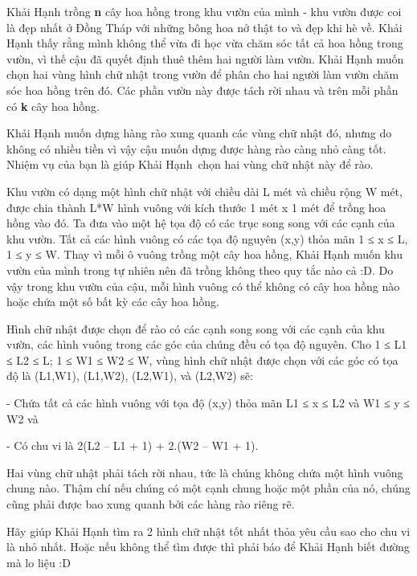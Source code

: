 

Khải Hạnh trồng \textbf{ n } cây hoa hồng trong khu vườn của mình - khu vườn được coi là đẹp nhất ở Đồng Tháp với những bông hoa nở thật to và đẹp khi hè về. Khải Hạnh thấy rằng mình không thể vừa đi học vừa chăm sóc tất cả hoa hồng trong vườn, vì thế cậu đã quyết định thuê thêm hai người làm vườn. Khải Hạnh muốn chọn hai vùng hình chữ nhật trong vườn để phân cho hai người làm vườn chăm sóc hoa hồng trên đó. Các phần vườn này được tách rời nhau và trên mỗi phần có \textbf{ k } cây hoa hồng.





Khải Hạnh muốn dựng hàng rào xung quanh các vùng chữ nhật đó, nhưng do không có nhiều tiền vì vậy cậu muốn dựng được hàng rào càng nhỏ càng tốt. Nhiệm vụ của bạn là giúp Khải Hạnh chọn hai vùng chữ nhật này để rào.


Khu vườn có dạng một hình chữ nhật với chiều dài L mét và chiều rộng W mét, được chia thành L*W hình vuông với kích thước 1 mét x 1 mét để trồng hoa hồng vào đó. Ta đưa vào một hệ tọa độ có các trục song song với các cạnh của khu vườn. Tất cả các hình vuông có các tọa độ nguyên (x,y) thỏa mãn 1 ≤ x ≤ L, 1 ≤ y ≤ W. Thay vì mỗi ô vuông trồng một cây hoa hồng, Khải Hạnh muốn khu vườn của mình trong tự nhiên nên đã trồng không theo quy tắc nào cả :D. Do vậy trong khu vườn của cậu, mỗi hình vuông có thể không có cây hoa hồng nào hoặc chứa một số bất kỳ các cây hoa hồng.


Hình chữ nhật được chọn để rào có các cạnh song song với các cạnh của khu vườn, các hình vuông trong các góc của chúng đều có tọa độ nguyên. Cho 1 ≤ L1 ≤ L2 ≤ L; 1 ≤ W1 ≤ W2 ≤ W, vùng hình chữ nhật được chọn với các góc có tọa độ là (L1,W1), (L1,W2), (L2,W1), và (L2,W2) sẽ:


- Chứa tất cả các hình vuông với tọa độ (x,y) thỏa mãn L1 ≤ x ≤ L2 và W1 ≤ y ≤ W2 và


- Có chu vi là 2(L2 – L1 + 1) + 2.(W2 – W1 + 1).


Hai vùng chữ nhật phải tách rời nhau, tức là chúng không chứa một hình vuông chung nào. Thậm chí nếu chúng có một cạnh chung hoặc một phần của nó, chúng cũng phải được bao xung quanh bởi các hàng rào riêng rẽ.





Hãy giúp Khải Hạnh tìm ra 2 hình chữ nhật tốt nhất thỏa yêu cầu sao cho chu vi là nhỏ nhất. Hoặc nếu không thể tìm được thì phải báo để Khải Hạnh biết đường mà lo liệu :D

